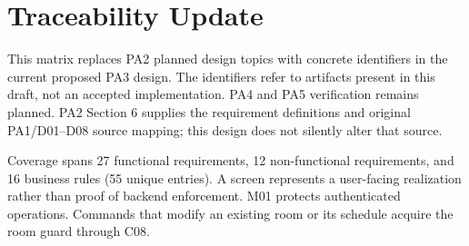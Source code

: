 \section{Traceability Update}
This matrix replaces PA2 planned design topics with concrete identifiers in the current proposed PA3 design. The identifiers refer to artifacts present in this draft, not an accepted implementation. PA4 and PA5 verification remains planned. PA2 Section 6 supplies the requirement definitions and original PA1/D01--D08 source mapping; this design does not silently alter that source.

Coverage spans 27 functional requirements, 12 non-functional requirements, and 16 business rules (55 unique entries). A screen represents a user-facing realization rather than proof of backend enforcement. M01 protects authenticated operations. Commands that modify an existing room or its schedule acquire the room guard through C08.

